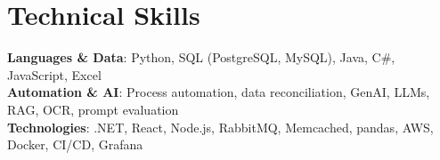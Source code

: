 \documentclass[letterpaper,11pt]{article}
\begin{document}
\section{Technical Skills}
\begin{itemize}[leftmargin=0.15in, label={}]
  \small{\item{
        \textbf{Languages \& Data}{: Python, SQL (PostgreSQL, MySQL), Java, C\#, JavaScript, Excel} \\
        \textbf{Automation \& AI}{: Process automation, data reconciliation, GenAI, LLMs, RAG, OCR, prompt evaluation} \\
        \textbf{Technologies}{: .NET, React, Node.js, RabbitMQ, Memcached, pandas, AWS, Docker, CI/CD, Grafana}
        }}
\end{itemize}
\end{document}
